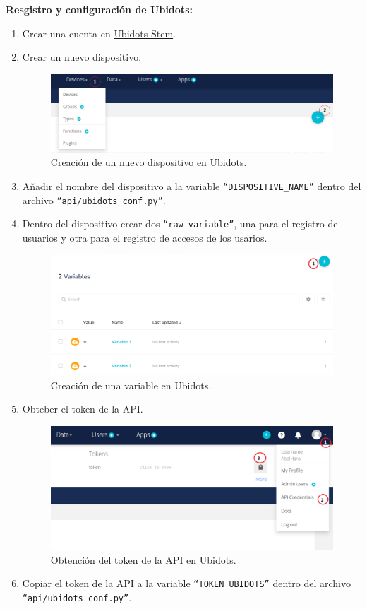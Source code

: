 \documentclass{article}
\begin{document}
\textbf{Resgistro y configuración de Ubidots:}
\begin{enumerate}
	\item Crear una cuenta en \href{https://stem.ubidots.com/}{Ubidots Stem}.
	\item Crear un nuevo dispositivo.
	\begin{figure}[H]
		\centering
		\includegraphics[width=0.7\linewidth]{../images/ubidots_create_device_1.png}
		\caption{\label{fig:ubidots_create_device_1}Creación de un nuevo dispositivo en Ubidots.}
	\end{figure}
	\item Añadir el nombre del dispositivo a la variable  \texttt{``DISPOSITIVE\_NAME''} dentro del archivo \texttt{``api/ubidots\_conf.py''}.
	\item Dentro del dispositivo crear dos \texttt{``raw variable''}, una para el registro de usuarios y otra para el registro de accesos de los usarios.
	\begin{figure}[H]
		\centering
		\includegraphics[width=0.7\linewidth]{../images/ubidots_create_variable.png}
		\caption{\label{fig:ubidots_create_variable_1}Creación de una variable en Ubidots.}
	\end{figure}
	\item Obteber el token de la API.
		\begin{figure}[H]
			\centering
			\includegraphics[width=0.7\linewidth]{../images/ubidots_obtener_token.png}
			\caption{\label{fig:ubidots_obtener_token}Obtención del token de la API en Ubidots.}
		\end{figure}
	\item Copiar el token de la API a la variable \texttt{``TOKEN\_UBIDOTS''} dentro del archivo \texttt{``api/ubidots\_conf.py''}.
\end{enumerate}
\end{document}
